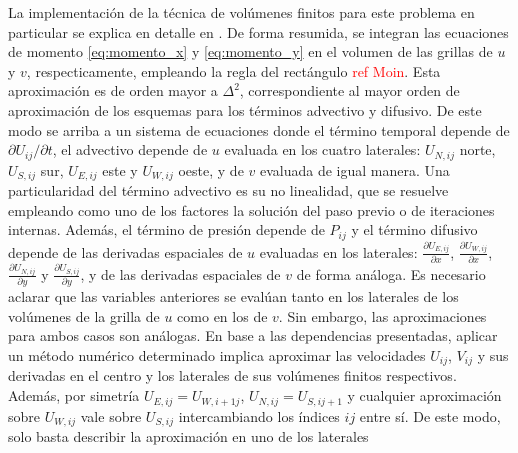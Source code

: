 \documentclass[aps,prb,twocolumn,superscriptaddress,floatfix,longbibliography,10pt]{revtex4-2}
\newif\ifptitle
\newif\ifpnumber
\newcounter{para}
\newcommand\ptitle[1]{\par\refstepcounter{para}
{\ifpnumber{\noindent\textcolor{lightgray}{\textbf{\thepara}}\indent}\fi}
{\ifptitle{\textbf{[{#1}]}}\fi}}
\begin{document}
\ptitle{Volúmenes finitos}
La implementación de la técnica de volúmenes finitos para este problema en particular se explica en detalle en \cite{Notas_materia}. De forma resumida, se integran las ecuaciones de momento \ref{eq:momento_x} y \ref{eq:momento_y} en el volumen de las grillas de $u$ y $v$, respecticamente, empleando la regla del rectángulo \textcolor{red}{ref Moin}. Esta aproximación es de orden mayor a $\Delta^2$, correspondiente al mayor orden de aproximación de los esquemas para los términos advectivo y difusivo. De este modo se arriba a un sistema de ecuaciones donde el término temporal depende de $\partial U_{ij}/ \partial t$, el advectivo depende de $u$ evaluada en los cuatro laterales: $U_{N,ij}$ norte, $U_{S,ij}$ sur, $U_{E,ij}$ este y $U_{W,ij}$ oeste, y de $v$ evaluada de igual manera. Una particularidad del término advectivo es su no linealidad, que se resuelve empleando como uno de los factores la solución del paso previo o de iteraciones internas. Además, el término de presión depende de $P_{ij}$ y el término difusivo depende de las derivadas espaciales de $u$ evaluadas en los laterales: $\frac{\partial U_{E,ij}}{\partial x}$, $\frac{\partial U_{W,ij}}{\partial x}$, $\frac{\partial U_{N,ij}}{\partial y}$ y $\frac{\partial U_{S,ij}}{\partial y}$, y de las derivadas espaciales de $v$ de forma análoga. Es necesario aclarar que las variables anteriores se evalúan tanto en los laterales de los volúmenes de la grilla de $u$ como en los de $v$. Sin embargo, las aproximaciones para ambos casos son análogas. En base a las dependencias presentadas, aplicar un método numérico determinado implica aproximar las velocidades $U_{ij}$, $V_{ij}$ y sus derivadas en el centro y los laterales de sus volúmenes finitos respectivos. Además, por simetría $U_{E,ij} = U_{W,i+1j}$, $U_{N,ij} = U_{S,ij+1}$ y cualquier aproximación sobre $U_{W,ij}$ vale sobre $U_{S,ij}$ intercambiando los índices $ij$ entre sí. De este modo, solo basta describir la aproximación en uno de los laterales
\end{document}
